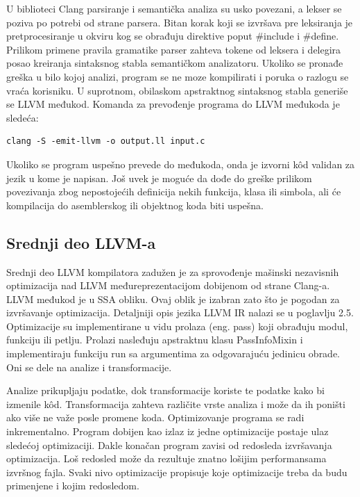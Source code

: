 \documentclass[12pt,oneside]{memoir}
\begin{document}
U biblioteci Clang parsiranje i semantička analiza su usko povezani, a lekser se
poziva po potrebi od strane parsera. Bitan korak koji se izvršava pre leksiranja
je pretprocesiranje u okviru kog se obrađuju direktive poput \#include i \#define.
Prilikom primene pravila gramatike parser zahteva tokene od leksera i delegira posao kreiranja sintaksnog stabla semantičkom analizatoru. Ukoliko se pronađe greška
u bilo kojoj analizi, program se ne moze kompilirati i poruka o razlogu se vraća korisniku. U suprotnom, obilaskom apstraktnog sintaksnog stabla generiše se LLVM
međukod. Komanda za prevođenje programa do LLVM međukoda je sledeća:
\begin{verbatim}
clang -S -emit-llvm -o output.ll input.c
\end{verbatim}

Ukoliko se program uspešno prevede do međukoda, onda je izvorni kôd validan za
jezik u kome je napisan. Još uvek je moguće da dođe do greške prilikom povezivanja
zbog nepostojećih definicija nekih funkcija, klasa ili simbola, ali će kompilacija do
asemblerskog ili objektnog koda biti uspešna.

\subsection{Srednji deo LLVM-a}
Srednji deo LLVM kompilatora zadužen je za sprovođenje mašinski nezavisnih optimizacija nad LLVM međureprezentacijom dobijenom od strane Clang-a. LLVM međukod je u SSA obliku. Ovaj oblik je izabran zato što je pogodan za izvršavanje optimizacija. Detaljniji opis jezika LLVM IR nalazi se u poglavlju 2.5.
Optimizacije su implementirane u vidu prolaza (eng. pass) koji obrađuju modul,
funkciju ili petlju. Prolazi nasleđuju apstraktnu klasu PassInfoMixin i implementiraju funkciju run sa argumentima za odgovarajuću jedinicu obrade. Oni se dele na
analize i transformacije. 

Analize prikupljaju podatke, dok transformacije koriste te
podatke kako bi izmenile kôd. Transformacija zahteva različite vrste analiza i može
da ih poništi ako više ne važe posle promene koda.
Optimizovanje programa se radi inkrementalno. Program dobijen kao izlaz iz
jedne optimizacije postaje ulaz sledećoj optimizaciji. Dakle konačan program zavisi
od redosleda izvršavanja optimizacija. Loš redosled može da rezultuje znatno lošijim
performansama izvršnog fajla. Svaki nivo optimizacije propisuje koje optimizacije
treba da budu primenjene i kojim redosledom.
\end{document}
